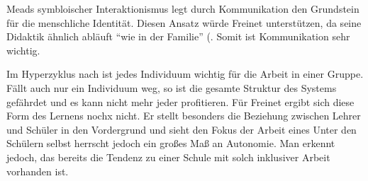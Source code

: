 Meads symbloischer Interaktionismus legt durch Kommunikation den Grundstein für die menschliche Identität.
Diesen Ansatz würde Freinet unterstützen, da seine Didaktik ähnlich abläuft ``wie in der Familie'' \parencite[~109]{Freinet1979}(.
Somit ist Kommunikation sehr wichtig.


Im Hyperzyklus nach \citeauthor{Zimpel2012} ist jedes Individuum wichtig für die Arbeit in einer Gruppe.
Fällt auch nur ein Individuum weg, so ist die gesamte Struktur des Systems gefährdet und es kann nicht mehr jeder profitieren.
Für Freinet ergibt sich diese Form des Lernens nochx nicht.
Er stellt besonders die Beziehung zwischen Lehrer und Schüler in den Vordergrund und sieht den Fokus der Arbeit eines
Unter den Schülern selbst herrscht jedoch ein großes Maß an Autonomie.
Man erkennt jedoch, das bereits die Tendenz zu einer Schule mit solch inklusiver Arbeit vorhanden ist.
